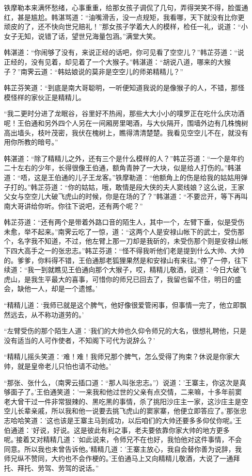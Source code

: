 \documentclass[12pt,oneside]{book}
\begin{document}
铁摩勒本来满怀愁绪，心事重重，给那女孩子调侃了几句，弄得哭笑不得，脸蛋通红，甚是尴尬。韩湛骂道：``油嘴滑舌，没一点规矩，我看哪，天下就没有比你更顽皮的了，还不快向世兄赔礼！''那女孩子学着大人的模样，检任一礼，说道：``小女子无知，说错了话，望世兄海量包涵。''满堂大笑。

韩湛道：``你闹够了没有，来说正经的话吧，你可见看了空空儿？''韩芷芬道：``说正经的，没有见着，却见着了一个大猴子。''韩湛道：``胡说八道，哪来的大猴子？''南霁云道：``韩姑娘说的莫非是空空儿的师弟精精儿？''

韩芷芬笑道：``到底是南大哥聪明，一听便知道我说的是像猴子的人，不错，那怪模怪样的家伙正是精精儿。

``我二更时分进了龙眠谷，谷里好不热闹，那些大大小小的噗罗正在吃什么庆功酒呢！王伯通和另外四个人另在一间厢房里喝酒，与大伙隔开，围墙外边有几株愧树高出墙头，枝叶茂密，我伏在槐树上，瞧得清清楚楚。我看见空空儿不在，就没有用你所教的暗号。''

韩湛道：``除了精精儿之外，还有三个是什么模样的人？''韩芷芬道：``一个是年约二十左右的少年，长得很像王伯通，额角青肿了一大块，似是给人打伤的。''韩湛道：``唔，这是王伯通的儿子王龙客。''铁摩勒道：``他额角上的伤是给我的姑姑用弹子打的。''韩芷芬道：``你的姑姑，哦，敢情是段大侠的夫人窦线娘？这么说，王家父女与空空儿大破飞虎山的时候，你是在场的了？''韩湛道：``不要岔开，等下再叫南大哥讲给你听。你往下说吧，还有两个呢？''

韩芷芬道：``还有两个是带着外路口音的陌生人，其中一个，左臂下垂，似是受伤未愈，举不起来。''南霁云吃了一惊，道：``这两个人是安禄山帐下的武士，受伤那个，名字我不知道，不过，他左臂上那一刀却是我斫的，未受伤那个则是安禄山帐下四大高手之一的张忠志。''韩芷芬道：``怪不得我听他们老是提到什么大帅、大帅的。爹爹，你料得不错，王伯通那老狐狸果然是和安禄山有来往。''停了一停，往下续道：``我一到就瞧见王伯通向那个大猴子，哎，精精儿敬酒，说道：`今日大破飞虎山，是我生平最大的喜事，可惜你的师兄已回去了，我留也留不住，明日的盛会，缺他一人，却是一个遗憾。'

``精精儿道：`我师已就是这个脾气，他好像很爱管闲事，但事情一完了，他立即飘然远去，从不称功道劳的。'

``左臂受伤的那个陌生人道：`我们的大帅也久仰令师兄的大名，很想礼聘他，只是没有适当的人可作使者，不知阁下可代为说辞么？'

``精精儿摇头笑道：`难！难！我师兄那个脾气，怎么受得了拘束？休说是你家大帅，就是皇帝老儿只怕也请不动他。'

``那张、张什么，（南霁云插口道：``那人叫张忠志。''）说道：'王寨主，你这次是真够面子了。'王伯通笑道：'一来我和他过世的父亲有点交情，二来嘛，十多年前窦老大曾干过一件非常狠辣的、黑吃黑的事情，杀了挑阳沙庄主一家，这沙庄主是空空儿长辈亲戚，所以我和他一说要去挑飞虎山的窦家寨，他便立即答应了。'那张忠志哈哈笑道：'这也该是王寨主马到成功，以后咱们的大帅还要多多仰仗你呢。'王伯通道：'好说，好说。这是彼此有利之事，老夫要依靠你家大帅的地方更多呢。'接着又对精精几道：'如此说来，令师兄不在也好，我怕他对这件事情，不会同意。所以我也未曾告诉他。'精精几道：'王寨主放心，我自会替你善为说辞，我师兄纵不赞同，大约也不会作梗的。'王伯通马上又向精精儿敬酒，大说了一通拜托、拜托、劳驾、劳驾的说话。''
\end{document}
